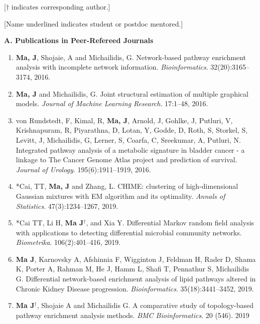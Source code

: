 \documentclass[10pt]{article}
\begin{document}
[$\dagger$ indicates corresponding author.]

[Name underlined indicates student or postdoc mentored.]

\medskip

\textbf{A. Publications in Peer-Refereed Journals}

\begin{enumerate}
\item \textbf{Ma, J}, Shojaie, A and Michailidis, G. Network-based pathway enrichment analysis with incomplete network information. {\em Bioinformatics}. 32(20):3165--3174, 2016.
\item \textbf{Ma, J} and Michailidis, G. Joint structural estimation of multiple graphical models. {\em Journal of Machine Learning Research}. 17:1--48, 2016.
\item von Rundstedt, F, Kimal, R, \textbf{Ma, J}, Arnold, J, Gohlke, J, Putluri, V, Krishnapuram, R, Piyarathna, D, Lotan, Y, Godde, D, Roth, S, Storkel, S, Levitt, J, Michailidis, G, Lerner, S, Coarfa, C, Sreekumar, A, Putluri, N. Integrated pathway analysis of a metabolic signature in bladder cancer - a linkage to The Cancer Genome Atlas project and prediction of survival. {\em Journal of Urology}. 195(6):1911--1919, 2016.
\item *Cai, TT, \textbf{Ma, J} and Zhang, L. CHIME: clustering of high-dimensional Gaussian mixtures with EM algorithm and its optimality. {\em Annals of Statistics}. 47(3):1234--1267, 2019. 
 \item *Cai TT, Li H, \textbf{Ma J}$^{\dagger}$, and Xia Y. Differential Markov random field analysis with applications to detecting differential microbial community networks. {\em Biometrika}. 106(2):401--416, 2019. 
 \item \textbf{Ma J}, Karnovsky A, Afshinnia F, Wigginton J, Feldman H, Rader D, Shama K, Porter A, Rahman M, He J, Hamm L, Shafi T, Pennathur S, Michailidis G. Differential network-based enrichment analysis of lipid pathways altered in Chronic Kidney Disease progression. {\em Bioinformatics}. 35(18):3441--3452, 2019.
 \item \textbf{Ma J}{$^{\dagger}$}, Shojaie A and Michailidis G. A comparative study of topology-based pathway enrichment analysis methods. {\em BMC Bioinformatics}. 20 (546). 2019 

\end{enumerate}
\end{document}
